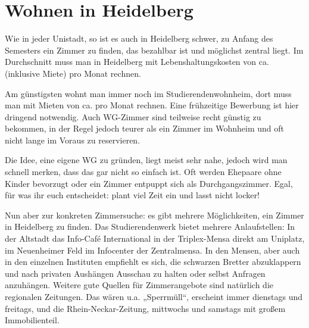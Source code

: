\section{Wohnen in Heidelberg}


Wie in jeder Unistadt, so ist es auch in Heidelberg schwer, zu Anfang des Semesters ein Zimmer zu finden, das bezahlbar ist und möglichst zentral liegt. Im Durchschnitt muss man in Heidelberg mit Lebenshaltungskosten von ca. \lebenshaltungskosten (inklusive Miete) pro Monat rechnen.

Am günstigsten wohnt man immer noch im Studierendenwohnheim, dort muss man mit Mieten von ca. \studentenwohnheim pro Monat rechnen. Eine frühzeitige Bewerbung ist hier dringend notwendig. Auch WG-Zimmer sind teilweise recht günstig zu bekommen, in der Regel jedoch teurer als ein Zimmer im Wohnheim und oft nicht lange im Voraus zu reservieren.

Die Idee, eine eigene WG zu gründen, liegt meist sehr nahe, jedoch wird man schnell merken, dass das gar nicht so einfach ist. Oft werden Ehepaare ohne Kinder bevorzugt oder ein Zimmer entpuppt sich als Durchgangszimmer. Egal, für was ihr euch entscheidet: plant viel Zeit ein und lasst nicht locker!

Nun aber zur konkreten Zimmersuche: es gibt mehrere Möglichkeiten, ein Zimmer in Heidelberg zu finden. Das Studierendenwerk bietet mehrere Anlaufstellen: In der Altstadt das Info-Café International in der Triplex-Mensa direkt am Uniplatz, im Neuenheimer Feld im Infocenter der Zentralmensa. In den Mensen, aber auch in den einzelnen Instituten empfiehlt es sich, die schwarzen Bretter abzuklappern und nach privaten Aushängen Ausschau zu halten oder selbst Anfragen anzuhängen. Weitere gute Quellen für Zimmerangebote sind natürlich die regionalen Zeitungen. Das wären u.a. „Sperrmüll“, erscheint immer dienstags und freitags, und die Rhein-Neckar-Zeitung, mittwochs und samstags mit großem Immobilienteil. %

